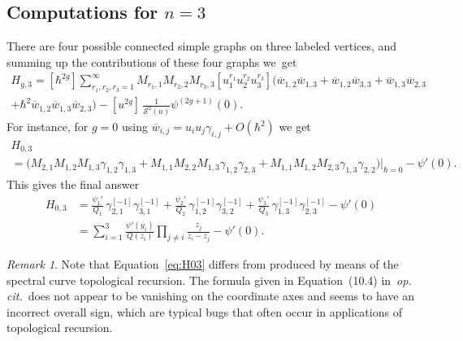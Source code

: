 \documentclass[JEP,XML,SOM,Unicode,NoEqCountersInSection,NoFloatCountersInSection]{cedram}
\let\mathcal\mathscr
\theoremstyle{plain}
\theoremstyle{definition}
\theoremstyle{remark}
\newtheorem{remark}[theorem]{Remark}
\newcommand{\cS}{\mathcal{S}}
\begin{document}
\subsection{Computations for \texorpdfstring{$n=3$}{n=3}}
There are four possible connected simple graphs on three labeled vertices, and summing up the contributions of these four graphs we~get
\begin{multline*}
H_{g,3} =[\hbar^{2g}]\sum_{r_1,r_2,r_3=1}^\infty M_{r_1,1} M_{r_2,2} M_{r_3,3}[u_1^{r_1}u_2^{r_2}u_3^{r_3}]
\bigl(\overline w_{1,2}\overline w_{1,3}+\overline w_{1,2}\overline w_{3,3}+\overline w_{1,3}\overline w_{2,3}
\\
+\hbar^2 \overline w_{1,2}\overline w_{1,3}\overline w_{2,3}\bigr)
- [u^{2g}]\,\frac1{\cS^2(u)}\psi^{(2g+1)}(0).
\end{multline*}
For instance, for $g=0$ using $\overline w_{i,j}=u_iu_j\gamma_{i,j}+O(\hbar^2)$ we get\vspace*{-5pt}
\begin{multline*}
H_{0,3}\\
=\bigl(M_{2,1}M_{1,2}M_{1,3}\gamma_{1,2}\gamma_{1,3}+
M_{1,1}M_{2,2}M_{1,3}\gamma_{1,2}\gamma_{2,3}+
M_{1,1}M_{1,2}M_{2,3}\gamma_{1,3}\gamma_{2,2}\bigr)\big|_{\hbar=0}-\psi'(0).
\end{multline*}
This gives the final answer
\begin{equation}\label{eq:H03}
\begin{aligned}
H_{0,3}&=
\frac{\psi_1'}{Q_1}\,\gamma_{2,1}^{[-1]}\gamma_{3,1}^{[-1]}
+\frac{\psi_2'}{Q_2}\,\gamma_{1,2}^{[-1]}\gamma_{3,2}^{[-1]}
+\frac{\psi_3'}{Q_3}\,\gamma_{1,3}^{[-1]}\gamma_{2,3}^{[-1]}
-\psi'(0)\\
&=
\sum_{i=1}^3\frac{\psi'(y_i)}{Q(z_i)}\prod_{j\ne i}\frac{z_j}{z_i-z_j}-\psi'(0).
\end{aligned}
\end{equation}
\begin{remark} Note that Equation~\eqref{eq:H03} differs from \cite[Prop.\,10.2 \& Eq.\,(10.4)]{ACEH-2} produced by means of the spectral curve topological recursion. The formula given in Equation~(10.4) in~\emph{op.\,cit.}\ does not appear to be vanishing on the coordinate axes and seems to have an incorrect overall sign, which are typical bugs that often occur in applications of topological recursion.
\end{remark}
\end{document}
